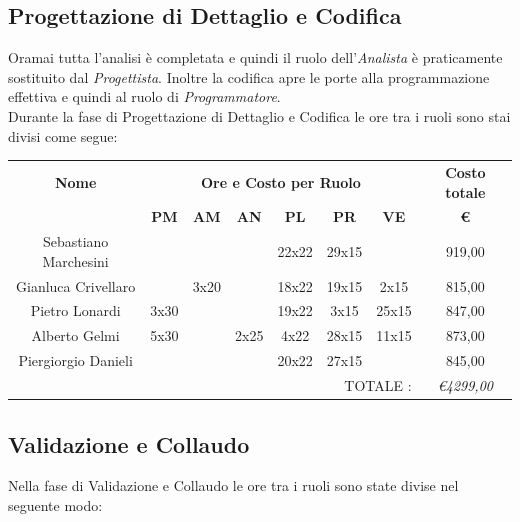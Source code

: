 \documentclass[12pt,a4paper,titlepage]{article}
\begin{document}
\subsection{Progettazione di Dettaglio e Codifica}
Oramai tutta l'analisi è completata e quindi il ruolo dell'\textit{Analista} è praticamente sostituito dal \textit{Progettista}. Inoltre la codifica apre le porte alla programmazione effettiva e quindi al ruolo di \textit{Programmatore}.\\
Durante la fase di Progettazione di Dettaglio e Codifica le ore tra i ruoli sono stai divisi come segue:
\\

{\renewcommand\arraystretch{1.2} %
	\begin{tabular}{|c|c|c|c|c|c|c|c|}
		\hline 
		\textbf{Nome} & \multicolumn{6}{c|}{\textbf{Ore e Costo per Ruolo}} & \textbf{Costo totale} \\ 
		& \textbf{PM} & \textbf{AM} & \textbf{AN} & \textbf{PL} & \textbf{PR} & \textbf{VE} & \textbf{ \euro } \\ 
		\hline
		Sebastiano Marchesini & & & & 22x22 & 29x15 & & 919,00 \\ 
		\hline 
		Gianluca Crivellaro & & 3x20 & & 18x22 & 19x15 & 2x15 & 815,00 \\ 
		\hline 
		Pietro Lonardi & 3x30 & & & 19x22 & 3x15 & 25x15 & 847,00 \\ 
		\hline 
		Alberto Gelmi & 5x30 & & 2x25 & 4x22 & 28x15 & 11x15 & 873,00 \\ 
		\hline 
		Piergiorgio Danieli & & & & 20x22 & 27x15 & & 845,00 \\ 
		\hline 
		\multicolumn{7}{r|}{TOTALE :} & \textit{\euro 4299,00} \\ 
\end{tabular}} 

\subsection{Validazione e Collaudo}
Nella fase di Validazione e Collaudo le ore tra i ruoli sono state divise nel seguente modo:
\\
\end{document}
